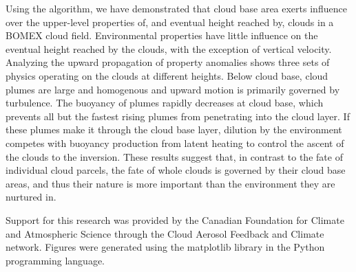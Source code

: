 \documentclass[acp]{copernicus}
\begin{document}
Using the algorithm, we have demonstrated that cloud base area exerts influence 
over the upper-level properties of, and eventual height reached by, clouds in a 
BOMEX cloud field.  Environmental properties have little influence on the 
eventual height reached by the clouds, with the exception of vertical velocity.
Analyzing the upward propagation of property anomalies shows three sets of 
physics operating on the clouds at different heights.  Below cloud base, cloud 
plumes are large and homogenous and upward motion is primarily governed by 
turbulence.  The buoyancy of plumes rapidly decreases at cloud base, which 
prevents all but the fastest rising plumes from penetrating into the cloud 
layer.  If these plumes make it through the cloud base layer, dilution by the 
environment competes with buoyancy production from latent heating to control 
the ascent of the clouds to the inversion.  These results suggest that, in 
contrast to the fate of individual cloud parcels, the fate of whole clouds is 
governed by their cloud base areas, and thus their nature is more important 
than the environment they are nurtured in.



\begin{acknowledgements}
Support for this research was provided by the Canadian Foundation for Climate 
and Atmospheric Science through the Cloud Aerosol Feedback and Climate 
network.  Figures were generated using the matplotlib library in the Python
programming language.
\end{acknowledgements}






\end{document}
